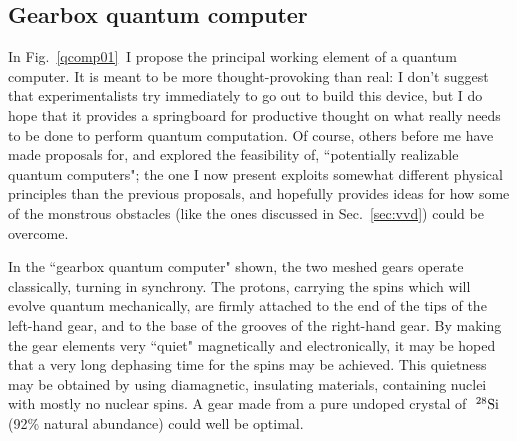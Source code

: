 \subsection{Gearbox quantum computer}
\label{sec:gearb}

In Fig.~\ref{qcomp01}$\ $ I propose the principal working element
of a quantum computer.
It is meant to be more thought-provoking than real: I don't suggest that
experimentalists try immediately to go out to build this device, but I do
hope that it provides a springboard for productive thought on what really
needs to be
done to perform quantum computation.  Of course, others before
me\cite{Lloyd,Obe}
have made proposals for, and explored the feasibility of\cite{Berm},
``potentially realizable
quantum computers"; the one I now present exploits somewhat different physical
principles than the previous proposals, and hopefully provides ideas for how
some of the monstrous
obstacles (like the ones discussed in Sec.~\ref{sec:vvd})
could be overcome.

In the ``gearbox quantum computer" shown, the two meshed gears operate
classically, turning in synchrony.  The protons, carrying the spins which
will evolve quantum mechanically,
are firmly
attached to the end of the tips of the left-hand gear, and to the base
of the grooves of the right-hand gear.
By making the gear elements very ``quiet" magnetically and
electronically, it may be hoped that a very long dephasing time
for the spins may be achieved.  This quietness may be obtained by using
diamagnetic, insulating materials, containing nuclei with mostly no
nuclear spins.  A gear made from a pure undoped crystal of
$\ ^{28}{\rm Si}$ (92\% natural abundance)
could well be optimal.

